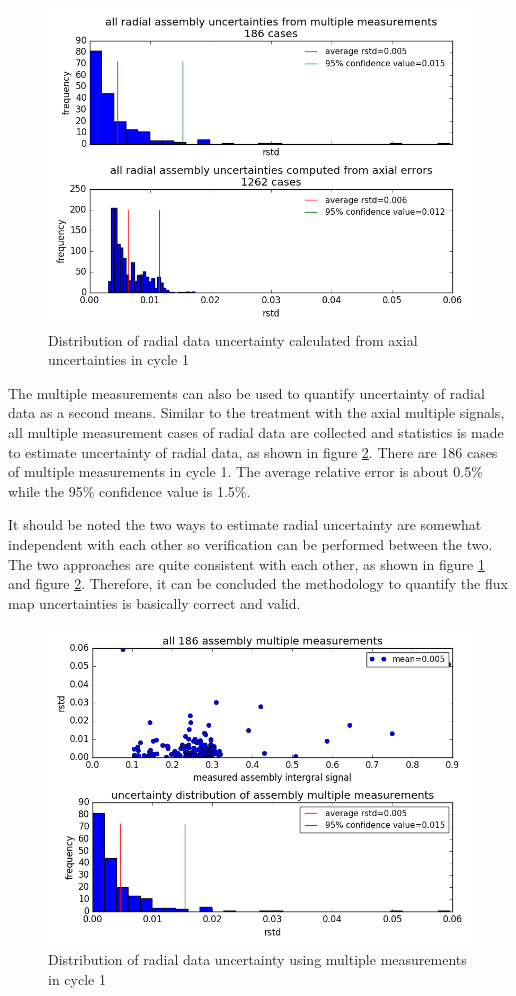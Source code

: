 \documentclass{article}
\begin{document}
\begin{figure}[ht]
\centering
\includegraphics[keepaspectratio, width = 4.0 in]{figures/flux_map_uncertainties/radial_uncertainty_combined_dist.png}
\caption{Distribution of radial data uncertainty calculated from axial uncertainties in cycle 1}
\label{fig:fig_radial_combined_dist}
\end{figure}

The multiple measurements can also be used to quantify uncertainty of radial data as a second means. Similar to the treatment with the axial multiple signals, all multiple measurement cases of radial data are collected and statistics is made to estimate uncertainty of radial data, as shown in figure \ref{fig:fig_radial_multiple_dist}. There are 186 cases of multiple measurements in cycle 1. The average relative error is about 0.5\% while the 95\% confidence value is 1.5\%.

It should be noted the two ways to estimate radial uncertainty are somewhat independent with each other so verification can be performed between the two.  The two approaches are quite consistent with each other, as shown in figure \ref{fig:fig_radial_combined_dist} and figure \ref{fig:fig_radial_multiple_dist}. Therefore, it can be concluded the methodology to quantify the flux map uncertainties is basically correct and valid.

\begin{figure}[ht]
\centering
\includegraphics[keepaspectratio, width = 4.0 in]{figures/flux_map_uncertainties/radial_uncertainty_multiple_dist.png}
\caption{Distribution of radial data uncertainty using multiple measurements in cycle 1}
\label{fig:fig_radial_multiple_dist}
\end{figure}
\end{document}
